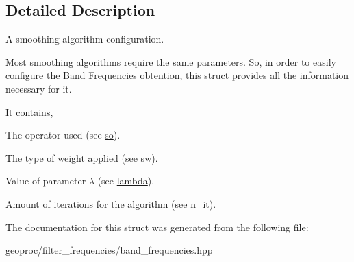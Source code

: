 \subsection{Detailed Description}
A smoothing algorithm configuration. 

Most smoothing algorithms require the same parameters. So, in order to easily configure the Band Frequencies obtention, this struct provides all the information necessary for it.

It contains,
\begin{DoxyItemize}
\item The operator used (see \hyperlink{structgeoproc_1_1filter__frequencies_1_1smoothing__configuration_aa384c253639793b2230cb744444b97c2}{so}).
\item The type of weight applied (see \hyperlink{structgeoproc_1_1filter__frequencies_1_1smoothing__configuration_a29f89d7b9df8ad82ed3759af569d8e67}{sw}).
\item Value of parameter $\lambda$ (see \hyperlink{structgeoproc_1_1filter__frequencies_1_1smoothing__configuration_a801c2ab0af402978ec941776e1d20d00}{lambda}).
\item Amount of iterations for the algorithm (see \hyperlink{structgeoproc_1_1filter__frequencies_1_1smoothing__configuration_aa9f5a87ca7e0084e9ac6f3c40d30310c}{n\+\_\+it}). 
\end{DoxyItemize}

The documentation for this struct was generated from the following file\+:\begin{DoxyCompactItemize}
\item 
geoproc/filter\+\_\+frequencies/band\+\_\+frequencies.\+hpp\end{DoxyCompactItemize}
